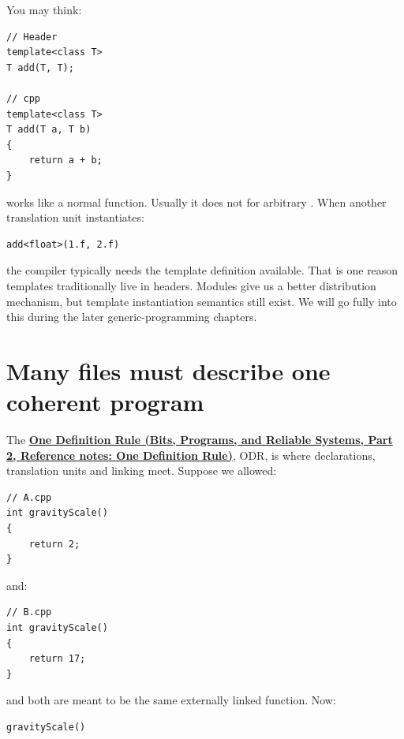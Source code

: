 \hypertarget{05-engine-i-ch002-templates-complicate-the-old-declarationimplementation-split}{}

You may think:

\begin{verbatim}
// Header
template<class T>
T add(T, T);

// cpp
template<class T>
T add(T a, T b)
{
    return a + b;
}
\end{verbatim}

works like a normal function. Usually it does not for arbitrary . When another translation unit instantiates:

\begin{verbatim}
add<float>(1.f, 2.f)
\end{verbatim}

the compiler typically needs the template definition available. That is one reason templates traditionally live in headers. Modules give us a better distribution mechanism, but template instantiation semantics still exist. We will go fully into this during the later generic-programming chapters.

\section{Many files must describe one coherent program}\label{05-engine-i-ch002-many-files-must-describe-one-coherent-program}

\hypertarget{05-engine-i-ch002-many-files-must-describe-one-coherent-program}{}

The \textbf{\href{../01-Bits-Programs-and-Reliable-Systems-P02/main.pdf\#nameddest=appendix-49d27bc9d9a5}{One Definition Rule (Bits, Programs, and Reliable Systems, Part 2, Reference notes: One Definition Rule)}}, ODR, is where declarations, translation units and linking meet. Suppose we allowed:

\begin{verbatim}
// A.cpp
int gravityScale()
{
    return 2;
}
\end{verbatim}

and:

\begin{verbatim}
// B.cpp
int gravityScale()
{
    return 17;
}
\end{verbatim}

and both are meant to be the same externally linked function. Now:

\begin{verbatim}
gravityScale()
\end{verbatim}

